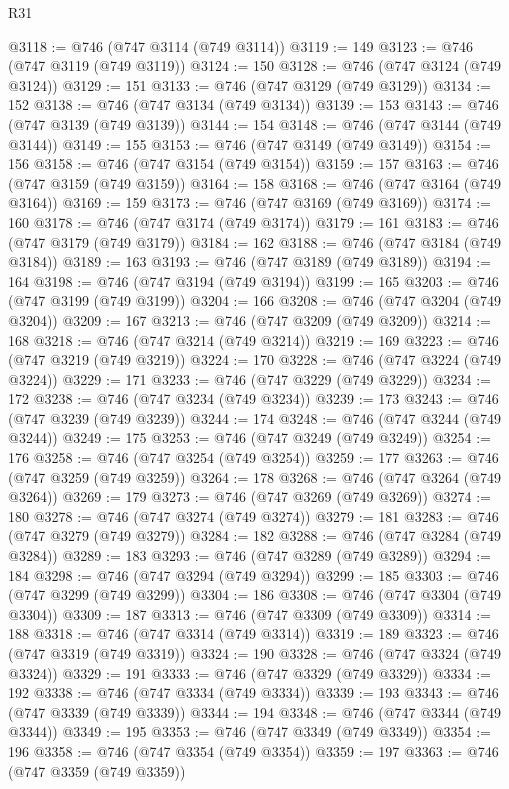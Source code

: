 \begin{lexlean}{R31}
\begin{coremodule}
@3118 := @746 (@747 @3114 (@749 @3114))
@3119 := 149
@3123 := @746 (@747 @3119 (@749 @3119))
@3124 := 150
@3128 := @746 (@747 @3124 (@749 @3124))
@3129 := 151
@3133 := @746 (@747 @3129 (@749 @3129))
@3134 := 152
@3138 := @746 (@747 @3134 (@749 @3134))
@3139 := 153
@3143 := @746 (@747 @3139 (@749 @3139))
@3144 := 154
@3148 := @746 (@747 @3144 (@749 @3144))
@3149 := 155
@3153 := @746 (@747 @3149 (@749 @3149))
@3154 := 156
@3158 := @746 (@747 @3154 (@749 @3154))
@3159 := 157
@3163 := @746 (@747 @3159 (@749 @3159))
@3164 := 158
@3168 := @746 (@747 @3164 (@749 @3164))
@3169 := 159
@3173 := @746 (@747 @3169 (@749 @3169))
@3174 := 160
@3178 := @746 (@747 @3174 (@749 @3174))
@3179 := 161
@3183 := @746 (@747 @3179 (@749 @3179))
@3184 := 162
@3188 := @746 (@747 @3184 (@749 @3184))
@3189 := 163
@3193 := @746 (@747 @3189 (@749 @3189))
@3194 := 164
@3198 := @746 (@747 @3194 (@749 @3194))
@3199 := 165
@3203 := @746 (@747 @3199 (@749 @3199))
@3204 := 166
@3208 := @746 (@747 @3204 (@749 @3204))
@3209 := 167
@3213 := @746 (@747 @3209 (@749 @3209))
@3214 := 168
@3218 := @746 (@747 @3214 (@749 @3214))
@3219 := 169
@3223 := @746 (@747 @3219 (@749 @3219))
@3224 := 170
@3228 := @746 (@747 @3224 (@749 @3224))
@3229 := 171
@3233 := @746 (@747 @3229 (@749 @3229))
@3234 := 172
@3238 := @746 (@747 @3234 (@749 @3234))
@3239 := 173
@3243 := @746 (@747 @3239 (@749 @3239))
@3244 := 174
@3248 := @746 (@747 @3244 (@749 @3244))
@3249 := 175
@3253 := @746 (@747 @3249 (@749 @3249))
@3254 := 176
@3258 := @746 (@747 @3254 (@749 @3254))
@3259 := 177
@3263 := @746 (@747 @3259 (@749 @3259))
@3264 := 178
@3268 := @746 (@747 @3264 (@749 @3264))
@3269 := 179
@3273 := @746 (@747 @3269 (@749 @3269))
@3274 := 180
@3278 := @746 (@747 @3274 (@749 @3274))
@3279 := 181
@3283 := @746 (@747 @3279 (@749 @3279))
@3284 := 182
@3288 := @746 (@747 @3284 (@749 @3284))
@3289 := 183
@3293 := @746 (@747 @3289 (@749 @3289))
@3294 := 184
@3298 := @746 (@747 @3294 (@749 @3294))
@3299 := 185
@3303 := @746 (@747 @3299 (@749 @3299))
@3304 := 186
@3308 := @746 (@747 @3304 (@749 @3304))
@3309 := 187
@3313 := @746 (@747 @3309 (@749 @3309))
@3314 := 188
@3318 := @746 (@747 @3314 (@749 @3314))
@3319 := 189
@3323 := @746 (@747 @3319 (@749 @3319))
@3324 := 190
@3328 := @746 (@747 @3324 (@749 @3324))
@3329 := 191
@3333 := @746 (@747 @3329 (@749 @3329))
@3334 := 192
@3338 := @746 (@747 @3334 (@749 @3334))
@3339 := 193
@3343 := @746 (@747 @3339 (@749 @3339))
@3344 := 194
@3348 := @746 (@747 @3344 (@749 @3344))
@3349 := 195
@3353 := @746 (@747 @3349 (@749 @3349))
@3354 := 196
@3358 := @746 (@747 @3354 (@749 @3354))
@3359 := 197
@3363 := @746 (@747 @3359 (@749 @3359))

\end{coremodule}
\end{lexlean}
